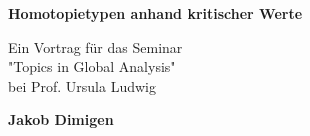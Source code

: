 \documentclass[a4paper,11pt]{article}
\begin{document}
\begin{titlepage}
    \begin{center}
        \vspace*{1cm}
 
        \Large{\textbf{Homotopietypen anhand kritischer Werte}}
 
        \vspace{0.5cm}
        Ein Vortrag für das Seminar \\ 
        "Topics in Global Analysis" \\
        bei Prof. Ursula Ludwig
             
        \vspace{1.5cm}
 
        \textbf{Jakob Dimigen}
             
    \end{center}
\end{titlepage}








\end{document}
